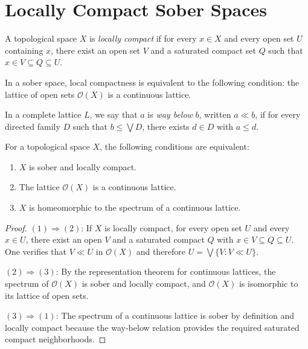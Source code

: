 \section{Locally Compact Sober Spaces}

\begin{definition}
A topological space $X$ is \emph{locally compact} if for every $x \in X$ and every open
set $U$ containing $x$, there exist an open set $V$ and a saturated compact set $Q$ such
that $x \in V \subseteq Q \subseteq U$.
\end{definition}

\begin{proposition}
In a sober space, local compactness is equivalent to the following condition: the lattice
of open sets $\mathcal{O}(X)$ is a continuous lattice.
\end{proposition}

\begin{definition}
In a complete lattice $L$, we say that $a$ is \emph{way below} $b$, written $a \ll b$,
if for every directed family $D$ such that $b \leq \bigvee D$, there exists $d \in D$
with $a \leq d$.
\end{definition}

\begin{theorem}
\label{thm:sober-lc}
For a topological space $X$, the following conditions are equivalent:
\begin{enumerate}
  \item $X$ is sober and locally compact.
  \item The lattice $\mathcal{O}(X)$ is a continuous lattice.
  \item $X$ is homeomorphic to the spectrum of a continuous lattice.
\end{enumerate}
\end{theorem}

\begin{proof}
$(1) \Rightarrow (2)$: If $X$ is locally compact, for every open set $U$ and every
$x \in U$, there exist an open $V$ and a saturated compact $Q$ with
$x \in V \subseteq Q \subseteq U$. One verifies that $V \ll U$ in $\mathcal{O}(X)$
and therefore $U = \bigvee \{V : V \ll U\}$.

$(2) \Rightarrow (3)$: By the representation theorem for continuous lattices, the
spectrum of $\mathcal{O}(X)$ is sober and locally compact, and $\mathcal{O}(X)$ is
isomorphic to its lattice of open sets.

$(3) \Rightarrow (1)$: The spectrum of a continuous lattice is sober by definition and
locally compact because the way-below relation provides the required saturated compact
neighborhoods.
\end{proof}

